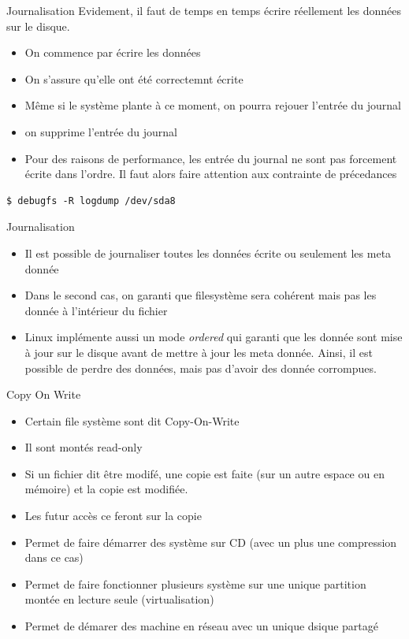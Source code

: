 \begin{frame}[fragile=singleslide]{Journalisation}
  Evidement, il faut  de temps en temps écrire  réellement les données
  sur le disque.
  \begin{itemize}
  \item On commence par écrire les données
  \item On s'assure qu'elle ont été correctemnt écrite
  \item  Même si  le système  plante à  ce moment,  on  pourra rejouer
    l'entrée du journal
  \item on supprime l'entrée du journal
  \item Pour des raisons de performance, les entrée du journal ne sont
    pas forcement  écrite dans l'ordre. Il faut  alors faire attention
    aux contrainte de précedances
  \end{itemize}
  \begin{lstlisting}
$ debugfs -R logdump /dev/sda8
  \end{lstlisting}
\end{frame}

\begin{frame}[fragile=singleslide]{Journalisation}
  \begin{itemize}
  \item Il  est possible de  journaliser toutes les données  écrite ou
    seulement les meta donnée
  \item Dans le  second cas, on garanti que  filesystème sera cohérent
    mais pas les donnée à l'intérieur du fichier
  \item Linux implémente aussi  un mode \emph{ordered} qui garanti que
    les donnée sont  mise à jour sur le disque avant  de mettre à jour
    les meta  donnée. Ainsi,  il est possible  de perdre  des données,
    mais pas d'avoir des donnée corrompues.
  \end{itemize}
\end{frame}

\begin{frame}[fragile=singleslide]{Copy On Write}
  \begin{itemize}
  \item Certain file système sont dit Copy-On-Write
  \item Il sont montés read-only
  \item Si  un fichier dit  être modifé, une  copie est faite  (sur un
    autre espace ou en mémoire) et la copie est modifiée.
  \item Les futur accès ce feront sur la copie
  \item Permet de faire démarrer des  système sur CD (avec un plus une
    compression dans ce cas)
  \item Permet  de faire fonctionner plusieurs système  sur une unique
    partition montée en lecture seule (virtualisation)
  \item Permet de démarer des  machine en réseau avec un unique dsique
    partagé
  \end{itemize}
\end{frame}

